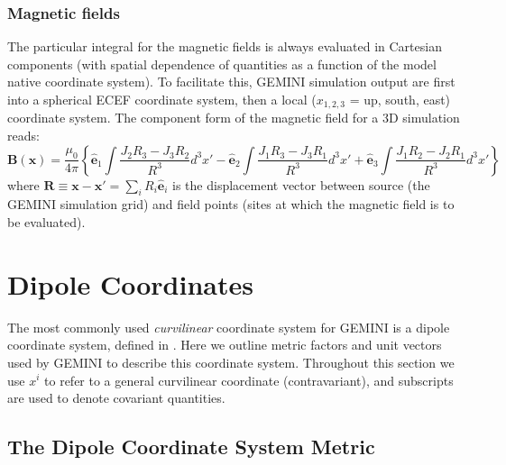 \documentclass[11pt,letterpaper]{article}
\begin{document}
\subsubsection{Magnetic fields}

The particular integral for the magnetic fields is always evaluated in Cartesian components (with spatial dependence of quantities as a function of the model native coordinate system).  To facilitate this, GEMINI simulation output are first into a spherical ECEF coordinate system, then a local ($x_{1,2,3}$ = up, south, east) coordinate system.  The component form of the magnetic field for a 3D simulation reads:
\begin{equation}
\mathbf{B}(\mathbf{x}) = \frac{\mu_0}{4 \pi} \left\{  \hat{\mathbf{e}}_1 \int \frac{J_2 R_3 - J_3 R_2}{R^3} d^3 x' - \hat{\mathbf{e}}_2 \int \frac{J_1 R_3 - J_3 R_1}{R^3} d^3 x' + \hat{\mathbf{e}}_3 \int \frac{J_1 R_2 - J_2 R_1}{R^3} d^3 x' \right\} \label{eqn:magint3D}
\end{equation}
where $\mathbf{R} \equiv \mathbf{x}-\mathbf{x'} = \sum_i R_i \hat{\mathbf{e}}_i$ is the displacement vector between source (the GEMINI simulation grid) and field points (sites at which the magnetic field is to be evaluated).  


\section{Dipole Coordinates}

The most commonly used \emph{curvilinear} coordinate system for GEMINI is a dipole coordinate system, defined in \citep{Huba:2000}.  Here we outline metric factors and unit vectors used by GEMINI to describe this coordinate system.  Throughout this section we use $x^i$ to refer to a general curvilinear coordinate (contravariant), and subscripts are used to denote covariant quantities.  %


\subsection{The Dipole Coordinate System Metric}
\end{document}
